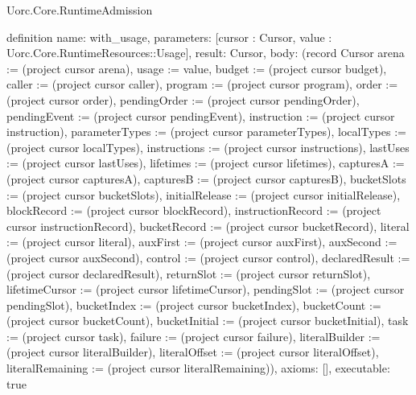 \begin{lexlean}{Uorc.Core.RuntimeAdmission}
\begin{semanticmodule}
definition{
  name: with_usage,
  parameters: [cursor : Cursor, value : Uorc.Core.RuntimeResources::Usage],
  result: Cursor,
  body: (record Cursor {arena := (project cursor arena), usage := value, budget := (project cursor budget), caller := (project cursor caller), program := (project cursor program), order := (project cursor order), pendingOrder := (project cursor pendingOrder), pendingEvent := (project cursor pendingEvent), instruction := (project cursor instruction), parameterTypes := (project cursor parameterTypes), localTypes := (project cursor localTypes), instructions := (project cursor instructions), lastUses := (project cursor lastUses), lifetimes := (project cursor lifetimes), capturesA := (project cursor capturesA), capturesB := (project cursor capturesB), bucketSlots := (project cursor bucketSlots), initialRelease := (project cursor initialRelease), blockRecord := (project cursor blockRecord), instructionRecord := (project cursor instructionRecord), bucketRecord := (project cursor bucketRecord), literal := (project cursor literal), auxFirst := (project cursor auxFirst), auxSecond := (project cursor auxSecond), control := (project cursor control), declaredResult := (project cursor declaredResult), returnSlot := (project cursor returnSlot), lifetimeCursor := (project cursor lifetimeCursor), pendingSlot := (project cursor pendingSlot), bucketIndex := (project cursor bucketIndex), bucketCount := (project cursor bucketCount), bucketInitial := (project cursor bucketInitial), task := (project cursor task), failure := (project cursor failure), literalBuilder := (project cursor literalBuilder), literalOffset := (project cursor literalOffset), literalRemaining := (project cursor literalRemaining)}),
  axioms: [],
  executable: true
}


\end{semanticmodule}
\end{lexlean}
